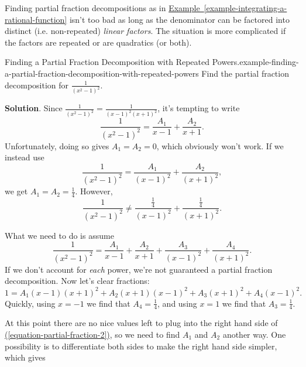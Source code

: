 \documentclass[10pt,]{book}
\numberwithin{equation}{section}
\begin{document}
\hypertarget{p-554}{}%
Finding partial fraction decompositions as in \hyperref[example-integrating-a-rational-function]{Example~\ref{example-integrating-a-rational-function}} isn't too bad as long as the denominator can be factored into distinct (i.e. non-repeated) \emph{linear factors}. The situation is more complicated if the factors are repeated or are quadratics (or both).%
\begin{example}{Finding a Partial Fraction Decomposition with Repeated Powers.}{example-finding-a-partial-fraction-decomposition-with-repeated-powers}%
\hypertarget{p-555}{}%
Find the partial fraction decomposition for \(\frac{1}{(x^{2} - 1)^{2}}\).%
\par\smallskip%
\noindent\textbf{Solution}.\hypertarget{solution-122}{}\quad%
\hypertarget{p-556}{}%
Since \(\frac{1}{(x^{2} - 1)^{2}} = \frac{1}{(x-1)^{2}(x+1)^{2}}\), it's tempting to write%
\begin{equation*}
\frac{1}{(x^{2}-1)^{2}} = \frac{A_{1}}{x-1} + \frac{A_{2}}{x+1}.
\end{equation*}
Unfortunately, doing so gives \(A_{1} = A_{2} = 0\), which obviously won't work. If we instead use%
\begin{equation*}
\frac{1}{(x^{2}-1)^{2}} = \frac{A_{1}}{(x-1)^{2}} + \frac{A_{2}}{(x+1)^{2}},
\end{equation*}
we get \(A_{1} = A_{2} = \frac{1}{4}\). However,%
\begin{equation*}
\frac{1}{(x^{2}-1)^{2}} \neq \frac{\frac{1}{4}}{(x-1)^{2}} + \frac{\frac{1}{4}}{(x+1)^{2}}.
\end{equation*}
%
\par
\hypertarget{p-557}{}%
What we need to do is assume%
\begin{equation*}
\frac{1}{(x^{2}-1)^{2}} = \frac{A_{1}}{x-1} + \frac{A_{2}}{x+1} + \frac{A_{3}}{(x-1)^{2}} + \frac{A_{4}}{(x+1)^{2}}.
\end{equation*}
If we don't account for \emph{each} power, we're not guaranteed a partial fraction decomposition. Now let's clear fractions:%
\begin{equation}
1 = A_{1}(x-1)(x+1)^{2} + A_{2}(x+1)(x-1)^{2} + A_{3}(x+1)^{2} + A_{4}(x-1)^{2}.\label{equation-partial-fraction-2}
\end{equation}
Quickly, using \(x=-1\) we find that \(A_{4} = \frac{1}{4}\), and using \(x = 1\) we find that \(A_{3} = \frac{1}{4}\).%
\par
\hypertarget{p-558}{}%
At this point there are no nice values left to plug into the right hand side of \hyperref[equation-partial-fraction-2]{(\ref{equation-partial-fraction-2})}, so we need to find \(A_{1}\) and \(A_{2}\) another way. One possibility is to differentiate both sides to make the right hand side simpler, which gives%

\end{example}
\end{document}
